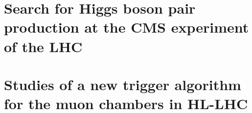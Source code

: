 \documentclass[12pt,a4paper,onehalfspacing]{book}
\begin{document}
\mainmatter













\part{Search for Higgs boson pair production at the CMS experiment of the LHC}



\part{Studies of a new trigger algorithm for the muon chambers in HL-LHC}












\appendix
\clearpage





\listoffigures
{}

\listoftables
{}


%
\end{document}
